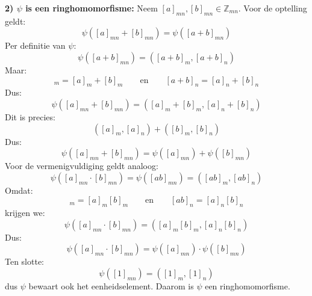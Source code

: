 \textbf{2) $\psi$ is een ringhomomorfisme:} Neem $[a]_{mn},[b]_{mn}\in\mathbb{Z}_{mn}$. Voor de optelling geldt:
\begin{equation*}
    \psi([a]_{mn}+[b]_{mn}) = \psi([a+b]_{mn})
\end{equation*}
Per definitie van $\psi$:
\begin{equation*}
    \psi([a+b]_{mn}) = ([a+b]_m,[a+b]_n)
\end{equation*}
Maar:
\begin{equation*}
    [a+b]_m=[a]_m+[b]_m \qquad \text{en} \qquad [a+b]_n=[a]_n+[b]_n
\end{equation*}
Dus:
\begin{equation*}
    \psi([a]_{mn}+[b]_{mn}) = ([a]_m+[b]_m,[a]_n+[b]_n)
\end{equation*}
Dit is precies:
\begin{equation*}
    ([a]_m,[a]_n)+([b]_m,[b]_n)
\end{equation*}
Dus:
\begin{equation*}
    \psi([a]_{mn}+[b]_{mn}) = \psi([a]_{mn})+\psi([b]_{mn})
\end{equation*}
Voor de vermenigvuldiging geldt analoog:
\begin{equation*}
    \psi([a]_{mn}\cdot[b]_{mn}) = \psi([ab]_{mn}) = ([ab]_m,[ab]_n)
\end{equation*}
Omdat:
\begin{equation*}
    [ab]_m=[a]_m[b]_m \qquad \text{en} \qquad [ab]_n=[a]_n[b]_n
\end{equation*}
krijgen we:
\begin{equation*}
    \psi([a]_{mn}\cdot[b]_{mn}) = ([a]_m[b]_m,[a]_n[b]_n)
\end{equation*}
Dus:
\begin{equation*}
    \psi([a]_{mn}\cdot[b]_{mn}) = \psi([a]_{mn})\cdot\psi([b]_{mn})
\end{equation*}
Ten slotte:
\begin{equation*}
    \psi([1]_{mn})=([1]_m,[1]_n)
\end{equation*}
dus $\psi$ bewaart ook het eenheidselement. Daarom is $\psi$ een ringhomomorfisme.

